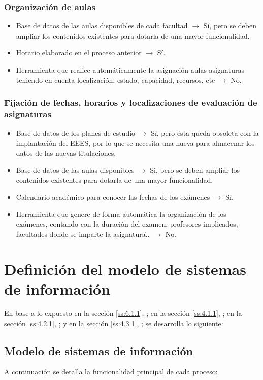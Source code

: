 \documentclass[11pt,a4paper,spanish,twoside]{book}
\begin{document}
\subsubsection{Organización de aulas}
\begin{itemize}
\item Base de datos de las aulas disponibles de cada facultad $\to$ Sí, pero
  se deben ampliar los contenidos existentes para dotarla de una mayor
  funcionalidad. 
\item Horario elaborado en el proceso anterior $\to$ Sí.
\item  Herramienta que realice automáticamente la asignación
  aulas-asignaturas teniendo en cuenta localización, estado, capacidad,
  recursos, etc $\to$ No.
\end{itemize}

\subsubsection{Fijación de fechas, horarios y localizaciones de evaluación de
  asignaturas} 
\begin{itemize}
\item Base de datos de los planes de estudio $\to$ Sí, pero ésta queda
  obsoleta con la implantación del EEES, por lo que se
  necesita una nueva para almacenar los datos de las nuevas titulaciones.  
\item Base de datos de las aulas disponibles $\to$ Si, pero se deben ampliar
  los contenidos existentes para dotarla de una mayor funcionalidad.
\item Calendario académico para conocer las fechas de los exámenes $\to$ Sí.
\item Herramienta que genere de forma automática la organización de los
    exámenes, contando con la duración del examen, profesores implicados,
    facultades donde se imparte la asignatura\... $\to$ No.
\end{itemize}

\section{Definición del modelo de sistemas de información}
En base a lo expuesto 
en la sección \vref{ss:6.1.1}, \emph{}; 
en la sección \vref{ss:4.1.1}, \emph{}; 
en la sección \vref{ss:4.2.1}, \emph{}; y
en la sección \vref{ss:4.3.1}, \emph{}; 
se desarrolla lo siguiente:

\subsection{Modelo de sistemas de información} \label{ss:6.2.1}
A continuación se detalla la funcionalidad principal de cada proceso:
\end{document}
